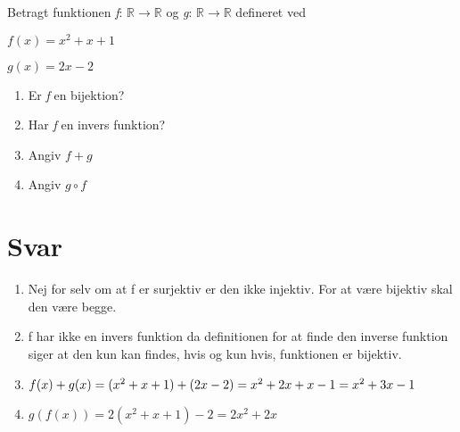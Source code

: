 
Betragt funktionen \textit{f}: $\mathbb{R} \rightarrow \mathbb{R}$ og \textit{g}: $\mathbb{R} \rightarrow \mathbb{R}$ defineret ved

$f(x)=x^2+x+1$ 

$g(x)=2x-2$ \vspace{5mm} 
\begin{enumerate}[label=(\alph*)] 
    \item Er \textit{f} en bijektion? \vspace{5mm} 
    \item Har \textit{f} en invers funktion?\vspace{5mm} 
    \item Angiv $f+g$ \vspace{5mm} 
    \item Angiv $g \circ f$
\end{enumerate}
\section*{Svar}
\begin{enumerate}[label=(\alph*)] 
    \item Nej for selv om at f er surjektiv er den ikke injektiv. For at være bijektiv skal den være begge. \vspace{5mm}
    \item f har ikke en invers funktion da definitionen for at finde den inverse funktion siger at den kun kan findes, hvis og kun hvis, funktionen er bijektiv.\vspace{5mm}
    \item $f(x)+g(x) = (x^2 + x + 1) + (2x - 2) = x^2 + 2x + x -1 = x^2 + 3x - 1 \vspace{5mm} \newline$
    \item $g(f(x)) = 2(x^2 + x +1) - 2 = 2x^2 + 2x$
\end{enumerate}
 


